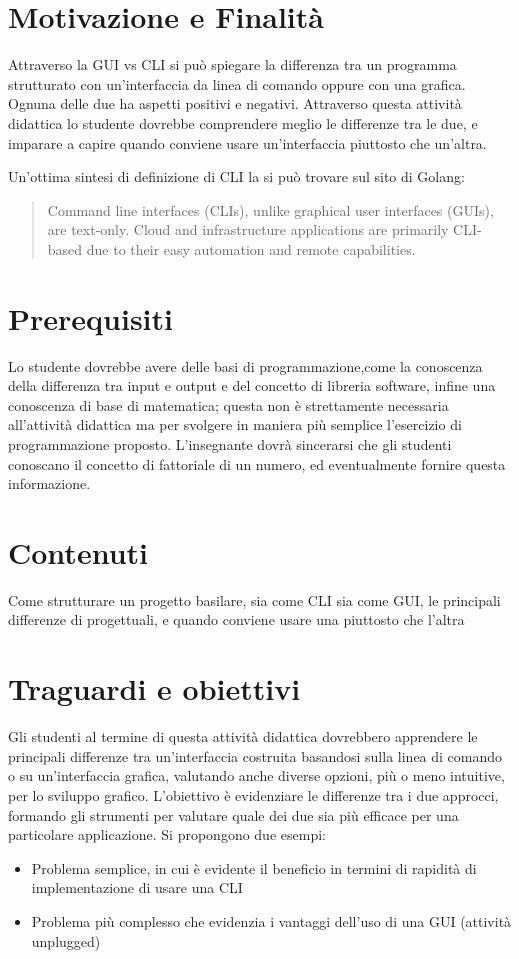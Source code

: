 \section{Motivazione e Finalità}

Attraverso la GUI vs CLI si può spiegare la differenza tra un programma strutturato con un'interfaccia da linea di comando oppure con una grafica. Ognuna delle due ha aspetti positivi e  negativi. Attraverso questa attività didattica lo studente dovrebbe comprendere meglio le differenze tra le due, e imparare a capire quando conviene usare un'interfaccia piuttosto che un'altra.

Un'ottima sintesi di definizione di CLI la si può trovare sul sito di Golang: \newline
\begin{quote}
    
Command line interfaces (CLIs), unlike graphical user interfaces (GUIs), are text-only. Cloud and infrastructure applications are primarily CLI-based due to their easy automation and remote capabilities. 

\end{quote}

\section{Prerequisiti}
Lo studente dovrebbe avere delle basi di programmazione,come la conoscenza della differenza tra input e output e del concetto di libreria software, infine una conoscenza di  base di matematica; questa non è strettamente necessaria all'attività didattica ma per svolgere in maniera più semplice l'esercizio di programmazione proposto. L'insegnante dovrà sincerarsi che gli studenti conoscano il concetto di fattoriale di un numero, ed eventualmente fornire questa informazione. 

\section{Contenuti}
Come strutturare un progetto basilare, sia come CLI sia come GUI, le principali differenze di progettuali, e quando conviene usare una piuttosto che l'altra

\section{Traguardi e obiettivi}
Gli studenti al termine di questa attività didattica dovrebbero apprendere le principali differenze tra un'interfaccia costruita basandosi sulla linea di comando o su un'interfaccia grafica, valutando anche diverse opzioni, più o meno intuitive, per lo sviluppo grafico. L'obiettivo è evidenziare le differenze tra i due approcci, formando gli strumenti per valutare quale dei due sia più efficace per una particolare applicazione. 
Si propongono due esempi:
\begin{itemize}
\item Problema semplice, in cui è evidente il beneficio in termini di rapidità di implementazione di usare una CLI
\item Problema più complesso che evidenzia i vantaggi dell'uso di una GUI (attività unplugged)
\end{itemize}